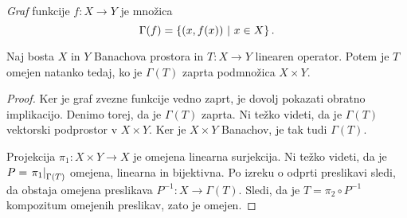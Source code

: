 
\begin{definicija}
\emph{Graf} funkcije $f \colon X \to Y$ je
množica
\[
\Gamma(f) = \left\{\left(x, f(x)\right)~\middle\vert~x \in X\right\}.
\]
\end{definicija}

\begin{izrek}
Naj bosta $X$ in $Y$ Banachova prostora in $T \colon X \to Y$
linearen operator. Potem je $T$ omejen natanko tedaj, ko je
$\Gamma(T)$ zaprta podmnožica $X \times Y$.
\end{izrek}

\begin{proof}
Ker je graf zvezne funkcije vedno zaprt, je dovolj pokazati obratno
implikacijo. Denimo torej, da je $\Gamma(T)$ zaprta. Ni težko
videti, da je $\Gamma(T)$ vektorski podprostor v $X \times Y$. Ker
je $X \times Y$ Banachov, je tak tudi $\Gamma(T)$.

Projekcija $\pi_1 \colon X \times Y \to X$ je omejena linearna
surjekcija. Ni težko videti, da je $P = \left. \pi_1\right|_{\Gamma(T)}^{}$
omejena, linearna in bijektivna. Po izreku o odprti preslikavi
sledi, da obstaja omejena preslikava
$P^{-1} \colon X \to \Gamma(T)$. Sledi, da je
$T = \pi_2 \circ P^{-1}$ kompozitum omejenih preslikav, zato je
omejen.
\end{proof}
